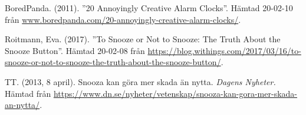 \begin{hangparas}{.25in}{1} 
BoredPanda. (2011). ''20 Annoyingly Creative Alarm Clocks''. Hämtad 20-02-10 från \url{www.boredpanda.com/20-annoyingly-creative-alarm-clocks/}.
\smallskip





Roitmann, Eva. (2017). ''To Snooze or Not to Snooze: The Truth About the Snooze Button''. Hämtad 20-02-08 från \url{https://blog.withings.com/2017/03/16/to-snooze-or-not-to-snooze-the-truth-about-the-snooze-button/}.
\smallskip

TT. (2013, 8 april). Snooza kan göra mer skada än nytta. \textit{Dagens Nyheter.} Hämtad från \url{https://www.dn.se/nyheter/vetenskap/snooza-kan-gora-mer-skada-an-nytta/}.
\end{hangparas}
